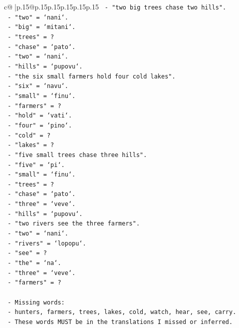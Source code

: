 \documentclass{article}
\begin{document}
{\begin{supertabular}{c@{$\;$}|p{.15\linewidth}@{}p{.15\linewidth}p{.15\linewidth}p{.15\linewidth}p{.15\linewidth}p{.15\linewidth}}
{{{\texttt{  {-} "two big trees chase two hills".} \\
\texttt{    {-} "two" = `nani`.} \\
\texttt{    {-} "big" = `mitani`.} \\
\texttt{    {-} "trees" = ?} \\
\texttt{    {-} "chase" = `pato`.} \\
\texttt{    {-} "two" = `nani`.} \\
\texttt{    {-} "hills" = `pupovu`.} \\
\texttt{  {-} "the six small farmers hold four cold lakes".} \\
\texttt{    {-} "six" = `navu`.} \\
\texttt{    {-} "small" = `finu`.} \\
\texttt{    {-} "farmers" = ?} \\
\texttt{    {-} "hold" = `vati`.} \\
\texttt{    {-} "four" = `pino`.} \\
\texttt{    {-} "cold" = ?} \\
\texttt{    {-} "lakes" = ?} \\
\texttt{  {-} "five small trees chase three hills".} \\
\texttt{    {-} "five" = `pi`.} \\
\texttt{    {-} "small" = `finu`.} \\
\texttt{    {-} "trees" = ?} \\
\texttt{    {-} "chase" = `pato`.} \\
\texttt{    {-} "three" = `veve`.} \\
\texttt{    {-} "hills" = `pupovu`.} \\
\texttt{  {-} "two rivers see the three farmers".} \\
\texttt{    {-} "two" = `nani`.} \\
\texttt{    {-} "rivers" = `lopopu`.} \\
\texttt{    {-} "see" = ?} \\
\texttt{    {-} "the" = `na`.} \\
\texttt{    {-} "three" = `veve`.} \\
\texttt{    {-} "farmers" = ?} \\
\\ 
\texttt{  {-} Missing words:} \\
\texttt{    {-} hunters, farmers, trees, lakes, cold, watch, hear, see, carry.} \\
\texttt{    {-} These words MUST be in the translations I missed or inferred.} \\
}}}
\end{supertabular}}
\end{document}
